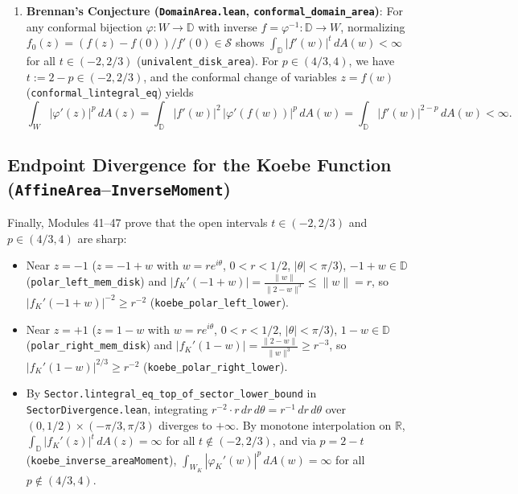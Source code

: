 \documentclass[11pt,reqno]{amsart}
\theoremstyle{definition}
\newcommand{\D}{\mathbb{D}}
\newcommand{\R}{\mathbb{R}}
\newcommand{\Sclass}{\mathcal{S}}
\begin{document}
\begin{enumerate}[label=(\arabic*)]
\item \textbf{Brennan's Conjecture (\texttt{DomainArea.lean}, \texttt{conformal\_domain\_area})}:
For any conformal bijection $\varphi : W \to \D$ with inverse $f = \varphi^{-1} : \D \to W$, normalizing $f_0(z) = (f(z)-f(0))/f'(0) \in \Sclass$ shows $\int_{\D}|f'(w)|^t\,dA(w) < \infty$ for all $t \in (-2, 2/3)$ (\texttt{univalent\_disk\_area}). For $p \in (4/3, 4)$, we have $t := 2-p \in (-2, 2/3)$, and the conformal change of variables $z = f(w)$ (\texttt{conformal\_lintegral\_eq}) yields
\[
\int_W |\varphi'(z)|^p\,dA(z) = \int_{\D} |f'(w)|^2 \,|\varphi'(f(w))|^p\,dA(w) = \int_{\D} |f'(w)|^{2-p}\,dA(w) < \infty.
\]
\end{enumerate}

\subsection{Endpoint Divergence for the Koebe Function (\texttt{AffineArea}--\texttt{InverseMoment})}

Finally, Modules 41--47 prove that the open intervals $t \in (-2, 2/3)$ and $p \in (4/3, 4)$ are sharp:
\begin{itemize}
\item Near $z = -1$ ($z = -1 + w$ with $w = r e^{i\theta}$, $0 < r < 1/2$, $|\theta| < \pi/3$), $-1+w \in \D$ (\texttt{polar\_left\_mem\_disk}) and $|f_K'(-1+w)| = \frac{\|w\|}{\|2-w\|^3} \le \|w\| = r$, so $|f_K'(-1+w)|^{-2} \ge r^{-2}$ (\texttt{koebe\_polar\_left\_lower}).
\item Near $z = +1$ ($z = 1 - w$ with $w = r e^{i\theta}$, $0 < r < 1/2$, $|\theta| < \pi/3$), $1-w \in \D$ (\texttt{polar\_right\_mem\_disk}) and $|f_K'(1-w)| = \frac{\|2-w\|}{\|w\|^3} \ge r^{-3}$, so $|f_K'(1-w)|^{2/3} \ge r^{-2}$ (\texttt{koebe\_polar\_right\_lower}).
\item By \texttt{Sector.lintegral\_eq\_top\_of\_sector\_lower\_bound} in \texttt{SectorDivergence.lean}, integrating $r^{-2} \cdot r\,dr\,d\theta = r^{-1}\,dr\,d\theta$ over $(0, 1/2) \times (-\pi/3, \pi/3)$ diverges to $+\infty$. By monotone interpolation on $\R$, $\int_{\D}|f_K'(z)|^t\,dA(z) = \infty$ for all $t \notin (-2, 2/3)$, and via $p = 2-t$ (\texttt{koebe\_inverse\_areaMoment}), $\int_{W_K}|\varphi_K'(w)|^p\,dA(w) = \infty$ for all $p \notin (4/3, 4)$.
\end{itemize}
\end{document}
